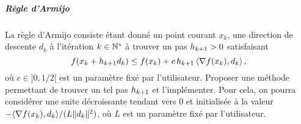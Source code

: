 \documentclass[a4paper,french,12pt]{article}
\begin{document}

\subparagraph{Règle d'Armijo} La règle d'Armijo consiste étant donné
un point courant $x_k$, une direction de descente $d_k$ à l'itération
$k \in \mathbb{N}^*$ à trouver un pas $h_{k+1} >0$ satisfaisant
\begin{equation*}
  f(x_{k} + h_{k+1} d_{k}) \leq f(x_{k}) 
+ c\, h_{k+1}\, \langle \nabla f(x_{k}),d_{k} \rangle \, , 
\end{equation*}
où $c \in ]0,1/2[$ est un paramètre fixé par l'utilisateur.  Proposer
une méthode permettant de trouver un tel pas $h_{k+1}$ et
l'implémenter. Pour cela, on pourra considérer une suite décroissante
tendant vers $0$ et initialisée à la valeur
$-\langle \nabla f(x_{k}),d_{k} \rangle/(L \|d_{k}\|^2)$, où $L$
est un paramètre fixé par l'utilisateur. 
\end{document}
